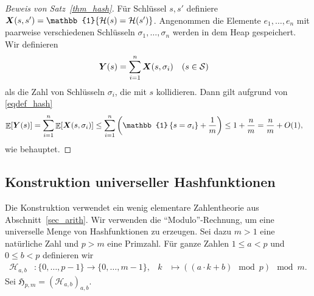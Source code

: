 \documentclass[10pt,reqno]{amsart}
\numberwithin{equation}{section}
\newcommand\cH{\mathcal H}
\newcommand\cS{\mathcal S}
\newcommand\fH{\mathfrak H}
\newcommand\vX{\vec X}
\newcommand\vY{\vec Y}
\def\vec#1{\mathchoice{\mbox{\boldmath$\displaystyle#1$}}
{\mbox{\boldmath$\textstyle#1$}}
{\mbox{\boldmath$\scriptstyle#1$}}
{\mbox{\boldmath$\scriptscriptstyle#1$}}}
\DeclareMathOperator{\ex}{\mathbb E}
\newcommand{\vecone}{\mathbb{1}}
\newcommand\bc[1]{\left({#1}\right)}
\newcommand\cbc[1]{\left\{{#1}\right\}}
\newcommand\Thm{Satz}
\begin{document}
\begin{proof}[Beweis von \Thm~\ref{thm_hash}]
	F\"ur Schl\"ussel $s,s'$ definiere $\vX(s,s')=\vecone\{\cH(s)=\cH(s')\}$.
	Angenommen die Elemente $e_1,\ldots,e_n$ mit paarweise verschiedenen Schl\"usseln $\sigma_1,\ldots,\sigma_n$ werden in dem Heap gespeichert.
	Wir definieren
	\begin{align*}
		\vY(s)&=\sum_{i=1}^n\vX(s,\sigma_i)&&(s\in\cS)
	\end{align*}
	als die Zahl von Schl\"usseln $\sigma_i$, die mit $s$ kollidieren.
	Dann gilt aufgrund von \eqref{eqdef_hash}
	\begin{align*}
		\ex[\vY(s)]&=\sum_{i=1}^n\ex[\vX(s,\sigma_i)]\leq\sum_{i=1}^n\bc{\vecone\cbc{s=\sigma_i}+\frac1m}\leq1+\frac nm=\frac nm+O(1),
	\end{align*}
	wie behauptet.
\end{proof}

\subsection{Konstruktion universeller Hashfunktionen}\label{sec_uni_constr}
Die Konstruktion verwendet ein wenig elementare Zahlentheorie aus Abschnitt~\ref{sec_arith}.
Wir verwenden die ``Modulo''-Rechnung, um eine universelle Menge von Hashfunktionen zu erzeugen.
Sei dazu $m>1$ eine nat\"urliche Zahl und $p>m$ eine Primzahl.
F\"ur ganze Zahlen $1\leq a<p$ und $0\leq b<p$ definieren wir
	\begin{align*}
		\cH_{a,b}&:\{0,\ldots,p-1\}\to\{0,\ldots,m-1\},&k&\mapsto((a\cdot k+b)\mod p)\mod m.
	\end{align*}
Sei $\fH_{p,m}=(\cH_{a,b})_{a,b}$.
\end{document}
